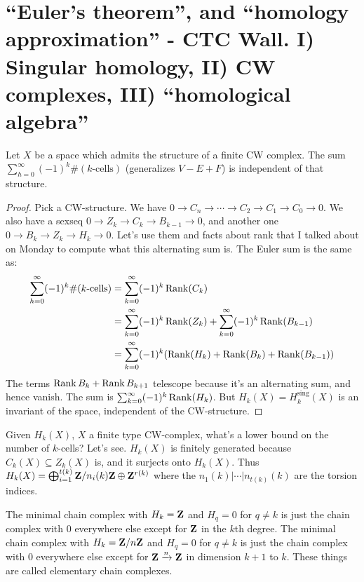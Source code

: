 \section{``Euler's theorem'', and ``homology approximation'' - CTC Wall. I) Singular homology, II) CW complexes, III) ``homological algebra''}
\begin{theorem}[``Euler'']
Let $X$ be a space which admits the structure of a finite CW complex. The sum $\sum_{h=0}^\infty (-1)^k\#(k\text{-cells})$ (generalizes $V-E+F$) is independent of that structure.
\end{theorem}
\begin{proof}
Pick a CW-structure. We have $0\to C_n\to\cdots\to C_2\to C_1\to C_0\to 0$. We also have a sexseq $0\to Z_k\to C_k\to B_{k-1}\to 0$, and another one $0\to B_k\to Z_k\to H_k\to 0$. Let's use them and facts about rank that I talked about on Monday to compute what this alternating sum is. The Euler sum is the same as:
\begin{align*}
\sum_{h=0}^\infty (-1)^k\#(k\text{-cells}) & = \sum^\infty_{k=0}(-1)^k\operatorname{Rank}(C_k)\\
& = \sum^\infty_{k=0}(-1)^k\operatorname{Rank}(Z_k)+\sum^\infty_{k=0}(-1)^k\operatorname{Rank}(B_{k-1})\\
& = \sum^\infty_{k=0}(-1)^k(\operatorname{Rank}( H_k)+\operatorname{Rank}(B_k)+\operatorname{Rank}(B_{k-1}))
\end{align*}
The terms $\operatorname{Rank} B_k+\operatorname{Rank} B_{k+1}$ telescope because it's an alternating sum, and hence vanish. The sum is $\sum^\infty_{k=0}(-1)^k\operatorname{Rank}( H_k)$. But $ H_k(X)= H_k^\text{sing}(X)$ is an invariant of the space, independent of the CW-structure.
\end{proof}
Given $ H_k(X)$, $X$ a finite type CW-complex, what's a lower bound on the number of $k$-cells? Let's see. $ H_k(X)$ is finitely generated because $C_k(X)\subseteq Z_k(X)$ is, and it surjects onto $ H_k(X)$. Thus $ H_k(X)=\bigoplus^{t(k)}_{i=1}\mathbf Z/n_i(k)\mathbf Z\oplus \mathbf Z^{r(k)}$ where the $n_1(k)|\cdots|n_{t(k)}(k)$ are the torsion indices.

The minimal chain complex with $ H_k=\mathbf Z$ and $ H_q=0$ for $q\neq k$ is just the chain complex with $0$ everywhere else except for $\mathbf Z$ in the $k$th degree. The minimal chain complex with $ H_k=\mathbf Z/n\mathbf Z$ and $ H_q=0$ for $q\neq k$ is just the chain complex with $0$ everywhere else except for $\mathbf Z\xrightarrow{n}\mathbf Z$ in dimension $k+1$ to $k$. These things are called elementary chain complexes.

